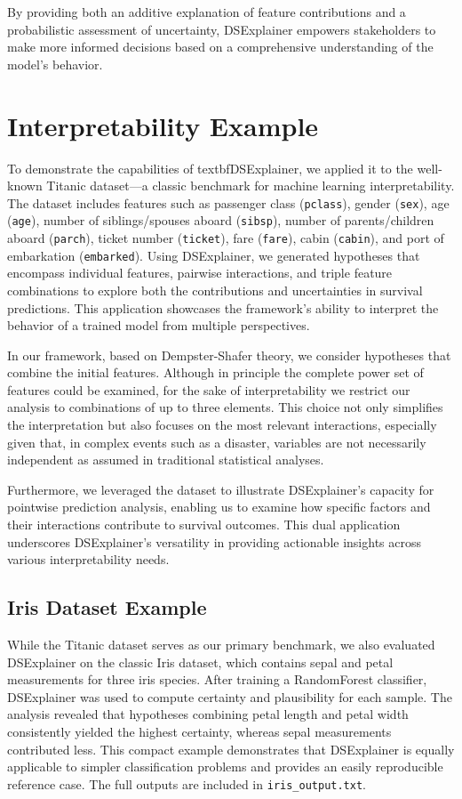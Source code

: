 \documentclass[acmlarge]{acmart}
\begin{document}
By providing both an additive explanation of feature contributions and a probabilistic assessment of uncertainty, DSExplainer empowers stakeholders to make more informed decisions based on a comprehensive understanding of the model’s behavior.
\section{Interpretability Example}
\label{sec:interpretability_example}

To demonstrate the capabilities of textbf{DSExplainer}, we applied it to the well-known Titanic dataset—a classic benchmark for machine learning interpretability. The dataset includes features such as passenger class (\texttt{pclass}), gender (\texttt{sex}), age (\texttt{age}), number of siblings/spouses aboard (\texttt{sibsp}), number of parents/children aboard (\texttt{parch}), ticket number (\texttt{ticket}), fare (\texttt{fare}), cabin (\texttt{cabin}), and port of embarkation (\texttt{embarked}). Using DSExplainer, we generated hypotheses that encompass individual features, pairwise interactions, and triple feature combinations to explore both the contributions and uncertainties in survival predictions. This application showcases the framework's ability to interpret the behavior of a trained model from multiple perspectives.

In our framework, based on Dempster-Shafer theory, we consider hypotheses that combine the initial features. Although in principle the complete power set of features could be examined, for the sake of interpretability we restrict our analysis to combinations of up to three elements. This choice not only simplifies the interpretation but also focuses on the most relevant interactions, especially given that, in complex events such as a disaster, variables are not necessarily independent as assumed in traditional statistical analyses.

Furthermore, we leveraged the dataset to illustrate DSExplainer's capacity for pointwise prediction analysis, enabling us to examine how specific factors and their interactions contribute to survival outcomes. This dual application underscores DSExplainer's versatility in providing actionable insights across various interpretability needs.

\subsection{Iris Dataset Example}

While the Titanic dataset serves as our primary benchmark, we also evaluated DSExplainer on the classic Iris dataset, which contains sepal and petal measurements for three iris species. After training a RandomForest classifier, DSExplainer was used to compute certainty and plausibility for each sample. The analysis revealed that hypotheses combining petal length and petal width consistently yielded the highest certainty, whereas sepal measurements contributed less. This compact example demonstrates that DSExplainer is equally applicable to simpler classification problems and provides an easily reproducible reference case. The full outputs are included in \texttt{iris\_output.txt}.
\end{document}
